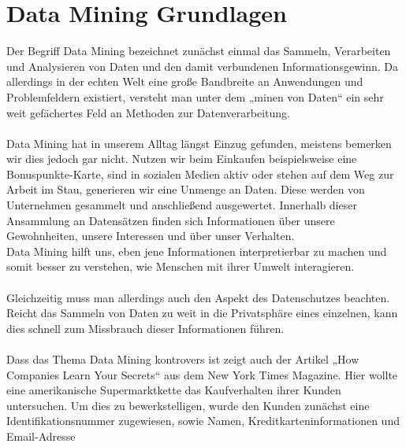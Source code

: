 %


%
%
\chapter{Data Mining Grundlagen}
\label{sec:intro}


Der Begriff Data Mining bezeichnet zunächst einmal das Sammeln, Verarbeiten und
Analysieren von Daten und den damit verbundenen Informationsgewinn. Da
allerdings in der echten Welt eine große Bandbreite an Anwendungen und
Problemfeldern existiert, versteht man unter dem „minen von Daten“ ein sehr
weit gefächertes Feld an Methoden zur Datenverarbeitung. \\
\\
Data Mining hat in unserem Alltag längst Einzug gefunden, meistens bemerken wir
dies jedoch gar nicht. Nutzen wir beim Einkaufen beispielsweise eine
Bonuspunkte-Karte, sind in sozialen Medien aktiv oder stehen auf dem Weg zur
Arbeit im Stau, generieren wir eine Unmenge an Daten. Diese werden von
Unternehmen gesammelt und anschließend ausgewertet. Innerhalb dieser Ansammlung
an Datensätzen finden sich Informationen über unsere Gewohnheiten, unsere
Interessen und über unser Verhalten. \\
Data Mining hilft uns, eben jene Informationen interpretierbar zu machen und
somit besser zu verstehen, wie Menschen mit ihrer Umwelt interagieren. \\
\\
Gleichzeitig muss man allerdings auch den Aspekt des Datenschutzes beachten.
Reicht das Sammeln von Daten zu weit in die Privatsphäre eines einzelnen,
kann dies schnell zum Missbrauch dieser Informationen führen. \\
\\
Dass das Thema Data Mining kontrovers ist zeigt auch der Artikel „How
Companies Learn Your Secrets“ aus dem New York Times Magazine. \cite{NYT:12} Hier wollte
eine amerikanische Supermarktkette das Kaufverhalten ihrer Kunden untersuchen.
Um dies zu bewerkstelligen, wurde den Kunden zunächst eine Identifikationsnummer
zugewiesen, sowie Namen, Kreditkarteninformationen und Email-Adresse

